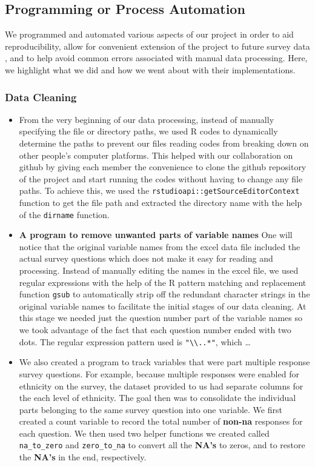 \documentclass[
  10pt,
]{article}
\begin{document}
\hypertarget{programming-or-process-automation}{%
\subsection{Programming or Process Automation}\label{programming-or-process-automation}}

We programmed and automated various aspects of our project in order to aid reproducibility, allow for convenient extension of the project to future survey data , and to help avoid common errors associated with manual data processing. Here, we highlight what we did and how we went about with their implementations.

\hypertarget{data-cleaning}{%
\subsubsection{Data Cleaning}\label{data-cleaning}}

\begin{itemize}
\item
  From the very beginning of our data processing, instead of manually specifying the file or directory paths, we used R codes to dynamically determine the paths to prevent our files reading codes from breaking down on other people's computer platforms. This helped with our collaboration on github by giving each member the convenience to clone the github repository of the project and start running the codes without having to change any file paths. To achieve this, we used the \texttt{rstudioapi::getSourceEditorContext} function to get the file path and extracted the directory name with the help of the \texttt{dirname} function.
\item
  \textbf{A program to remove unwanted parts of variable names}
  One will notice that the original variable names from the excel data file included the actual survey questions which does not make it easy for reading and processing. Instead of manually editing the names in the excel file, we used regular expressions with the help of the R pattern matching and replacement function \texttt{gsub} to automatically strip off the redundant character strings in the original variable names to facilitate the initial stages of our data cleaning. At this stage we needed just the question number part of the variable names so we took advantage of the fact that each question number ended with two dots. The regular expression pattern used is \texttt{"\textbackslash{}\textbackslash{}..*"}, which \ldots{}
\item
  We also created a program to track variables that were part multiple response survey questions. For example, because multiple responses were enabled for ethnicity on the survey, the dataset provided to us had separate columns for the each level of ethnicity. The goal then was to consolidate the individual parts belonging to the same survey question into one variable. We first created a count variable to record the total number of \textbf{non-na} responses for each question. We then used two helper functions we created called \texttt{na\_to\_zero} and \texttt{zero\_to\_na} to convert all the \textbf{NA's} to zeros, and to restore the \textbf{NA's} in the end, respectively.
\end{itemize}
\end{document}
